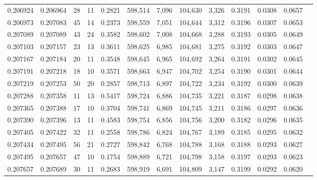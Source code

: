 \begin{tabular}{rrrrrrrrrrrrr}
0.206924 & 0.206964 &    28 &  11 &                                     0.2821 & 598,514 &   7,096 & 104,630 &   3,326 & 0.3191 & 0.0308 & 0.0657 \\
0.206973 & 0.207083 &    45 &  14 &                                     0.2373 & 598,559 &   7,051 & 104,644 &   3,312 & 0.3196 & 0.0307 & 0.0653 \\
0.207089 & 0.207089 &    43 &  24 &                                     0.3582 & 598,602 &   7,008 & 104,668 &   3,288 & 0.3193 & 0.0305 & 0.0649 \\
0.207103 & 0.207157 &    23 &  13 &                                     0.3611 & 598,625 &   6,985 & 104,681 &   3,275 & 0.3192 & 0.0303 & 0.0647 \\
0.207167 & 0.207184 &    20 &  11 &                                     0.3548 & 598,645 &   6,965 & 104,692 &   3,264 & 0.3191 & 0.0302 & 0.0645 \\
0.207191 & 0.207218 &    18 &  10 &                                     0.3571 & 598,663 &   6,947 & 104,702 &   3,254 & 0.3190 & 0.0301 & 0.0644 \\
0.207219 & 0.207253 &    50 &  20 &                                     0.2857 & 598,713 &   6,897 & 104,722 &   3,234 & 0.3192 & 0.0300 & 0.0639 \\
0.207288 & 0.207358 &    11 &  13 &                                     0.5417 & 598,724 &   6,886 & 104,735 &   3,221 & 0.3187 & 0.0298 & 0.0638 \\
0.207365 & 0.207388 &    17 &  10 &                                     0.3704 & 598,741 &   6,869 & 104,745 &   3,211 & 0.3186 & 0.0297 & 0.0636 \\
0.207390 & 0.207396 &    13 &  11 &                                     0.4583 & 598,754 &   6,856 & 104,756 &   3,200 & 0.3182 & 0.0296 & 0.0635 \\
0.207405 & 0.207422 &    32 &  11 &                                     0.2558 & 598,786 &   6,824 & 104,767 &   3,189 & 0.3185 & 0.0295 & 0.0632 \\
0.207434 & 0.207495 &    56 &  21 &                                     0.2727 & 598,842 &   6,768 & 104,788 &   3,168 & 0.3188 & 0.0293 & 0.0627 \\
0.207495 & 0.207657 &    47 &  10 &                                     0.1754 & 598,889 &   6,721 & 104,798 &   3,158 & 0.3197 & 0.0293 & 0.0623 \\
0.207657 & 0.207689 &    30 &  11 &                                     0.2683 & 598,919 &   6,691 & 104,809 &   3,147 & 0.3199 & 0.0292 & 0.0620 \\

\end{tabular}
